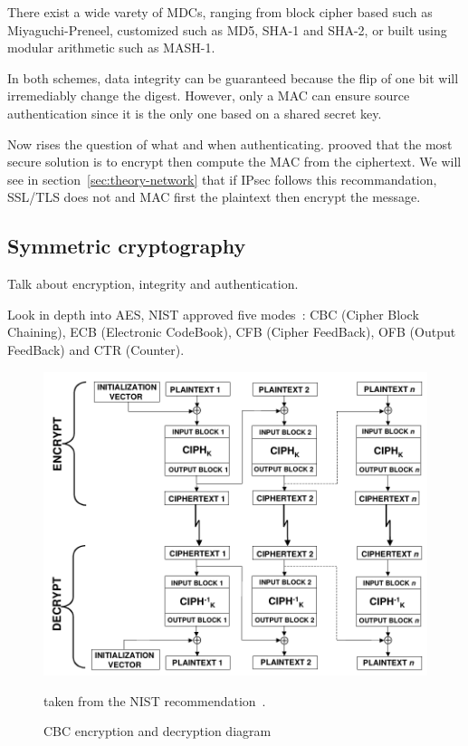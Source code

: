 \noindent There exist a wide varety of MDCs, ranging from block cipher based such as Miyaguchi-Preneel, customized such as MD5, SHA-1 and SHA-2, or built using modular arithmetic such as MASH-1.

In both schemes, data integrity can be guaranteed because the flip of one bit will irremediably change the digest.
However, only a MAC can ensure source authentication since it is the only one based on a shared secret key.

Now rises the question of what and when authenticating.
\citet{Bellare2000} prooved that the most secure solution is to encrypt then compute the MAC from the ciphertext.
We will see in section~\ref{sec:theory-network} that if IPsec follows this recommandation, SSL/TLS does not and MAC first the plaintext then encrypt the message.







\subsection{Symmetric cryptography}
Talk about encryption, integrity and authentication.

Look in depth into AES, NIST approved five modes~\cite{nist-sp800-38A}: CBC (Cipher Block Chaining), ECB (Electronic CodeBook), CFB (Cipher FeedBack), OFB (Output FeedBack) and CTR (Counter).

\begin{figure}
\includegraphics[width=\textwidth]{nist-cbc}
\caption{CBC encryption and decryption diagram}{taken from the NIST recommendation~\cite{nist-sp800-38A}.}
\label{fig:cbc-encrypt-decrypt}
\end{figure}

